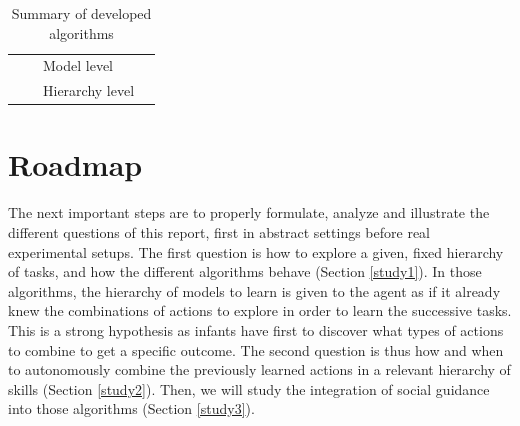 \documentclass[12pt]{article}
\begin{document}
\begin{table}[H]
\begin{tabular}{|l|l|l|c|}
		\multicolumn{1}{|c|}{}                                                                               &                                                                                             & Model level                              &                     \\ \cline{3-3}
		\multicolumn{1}{|c|}{}                                                                               &                                                                                             & Hierarchy level                          &                     \\ \hline
		\end{tabular}
		\caption{Summary of developed algorithms}
		\label{recap}
	\end{table}
	
%

\section{Roadmap}
	
	
	\paragraph{}%
	The next important steps are to properly formulate, analyze and illustrate the different questions of this report, first in abstract settings before real experimental setups.
	The first question is how to explore a given, fixed hierarchy of tasks, and how the different algorithms behave (Section \ref{study1}).
	In those algorithms, the hierarchy of models to learn is given to the agent as if it already knew the combinations of actions to explore in order to learn the successive tasks.
	This is a strong hypothesis as infants have first to discover what types of actions to combine to get a specific outcome.	
	The second question is thus how and when to autonomously combine the previously learned actions in a relevant hierarchy of skills (Section \ref{study2}).	
	Then, we will study the integration of social guidance into those algorithms (Section \ref{study3}).
	
\end{document}
